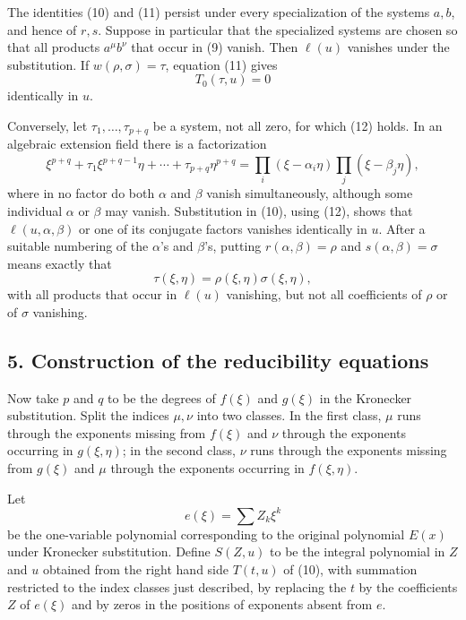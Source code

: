 \documentclass[12pt]{article}
\begin{document}
The identities (10) and (11) persist under every specialization of the systems $a,b$, and hence of $r,s$. Suppose in particular that the specialized systems are chosen so that all products $a^\mu b^\nu$ that occur in (9) vanish. Then $\ell(u)$ vanishes under the substitution. If $w(\rho,\sigma)=\tau$, equation (11) gives
\begin{equation}
  T_0(\tau,u)=0                                                    \tag{12}
\end{equation}
identically in $u$.

Conversely, let $\tau_1,\ldots,\tau_{p+q}$ be a system, not all zero, for which (12) holds. In an algebraic extension field there is a factorization
\[
  \xi^{p+q}+\tau_1\xi^{p+q-1}\eta+\cdots+\tau_{p+q}\eta^{p+q}
  =\prod_i(\xi-\alpha_i\eta)\prod_j(\xi-\beta_j\eta),
\]
where in no factor do both $\alpha$ and $\beta$ vanish simultaneously, although some individual $\alpha$ or $\beta$ may vanish. Substitution in (10), using (12), shows that $\ell(u,\alpha,\beta)$ or one of its conjugate factors vanishes identically in $u$. After a suitable numbering of the $\alpha$'s and $\beta$'s, putting $r(\alpha,\beta)=\rho$ and $s(\alpha,\beta)=\sigma$ means exactly that
\begin{equation}
  \tau(\xi,\eta)=\rho(\xi,\eta)\sigma(\xi,\eta),                    \tag{13}
\end{equation}
with all products that occur in $\ell(u)$ vanishing, but not all coefficients of $\rho$ or of $\sigma$ vanishing.

\subsection*{5. Construction of the reducibility equations}

Now take $p$ and $q$ to be the degrees of $f(\xi)$ and $g(\xi)$ in the Kronecker substitution. Split the indices $\mu,\nu$ into two classes. In the first class, $\mu$ runs through the exponents missing from $f(\xi)$ and $\nu$ through the exponents occurring in $g(\xi,\eta)$; in the second class, $\nu$ runs through the exponents missing from $g(\xi)$ and $\mu$ through the exponents occurring in $f(\xi,\eta)$.

Let
\[
  e(\xi)=\sum Z_k\xi^k
\]
be the one-variable polynomial corresponding to the original polynomial $E(x)$ under Kronecker substitution. Define $S(Z,u)$ to be the integral polynomial in $Z$ and $u$ obtained from the right hand side $T(t,u)$ of (10), with summation restricted to the index classes just described, by replacing the $t$ by the coefficients $Z$ of $e(\xi)$ and by zeros in the positions of exponents absent from $e$.
\end{document}
